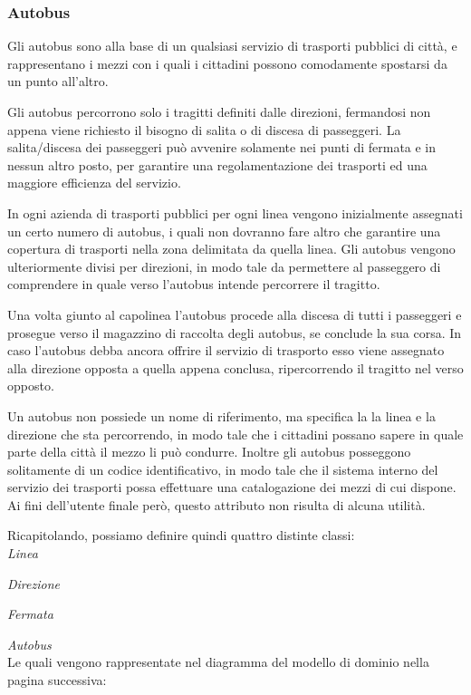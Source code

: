 \subsubsection{Autobus} %
\label{ssub:autobus}
Gli autobus sono alla base di un qualsiasi servizio di trasporti pubblici di città, e rappresentano i mezzi con i quali i cittadini possono comodamente spostarsi da un punto all'altro.

Gli autobus percorrono solo i tragitti definiti dalle direzioni, fermandosi non appena viene richiesto il bisogno di salita o di discesa di passeggeri. La salita/discesa dei passeggeri può avvenire solamente nei punti di fermata e in nessun altro posto, per garantire una regolamentazione dei trasporti ed una maggiore efficienza del servizio.

In ogni azienda di trasporti pubblici per ogni linea vengono inizialmente assegnati un certo numero di autobus, i quali non dovranno fare altro che garantire una copertura di trasporti nella zona delimitata da quella linea. Gli autobus vengono ulteriormente divisi per direzioni, in modo tale da permettere al passeggero di comprendere in quale verso l'autobus intende percorrere il tragitto.

Una volta giunto al capolinea l'autobus procede alla discesa di tutti i passeggeri e prosegue verso il magazzino di raccolta degli autobus, se conclude la sua corsa. In caso l'autobus debba ancora offrire il servizio di trasporto esso viene assegnato alla direzione opposta a quella appena conclusa, ripercorrendo il tragitto nel verso opposto.

Un autobus non possiede un nome di riferimento, ma specifica la la linea e la direzione che sta percorrendo, in modo tale che i cittadini possano sapere in quale parte della città il mezzo li può condurre.
Inoltre gli autobus posseggono solitamente di un codice identificativo, in modo tale che il sistema interno del servizio dei trasporti possa effettuare una catalogazione dei mezzi di cui dispone. Ai fini dell'utente finale però, questo attributo non risulta di alcuna utilità.

Ricapitolando, possiamo definire quindi quattro distinte classi:\\

{\itshape Linea}

{\itshape Direzione}

{\itshape Fermata}

{\itshape Autobus}\\

Le quali vengono rappresentate nel diagramma del modello di dominio nella pagina successiva:

